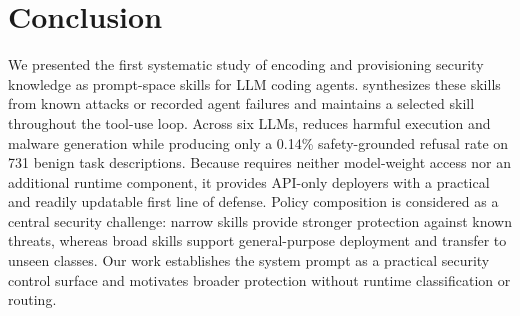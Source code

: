 \section{Conclusion}
\label{sec:conclusion}



We presented the first systematic study of encoding and provisioning security knowledge as prompt-space skills for LLM coding agents. \sysname synthesizes these skills from known attacks or recorded agent failures and maintains a selected skill throughout the tool-use loop. Across six LLMs, \sysname reduces harmful execution and malware generation while producing only a 0.14\% safety-grounded refusal rate on 731 benign task descriptions.
Because \sysname requires neither model-weight access nor an additional runtime component, it provides API-only deployers with a practical and readily updatable first line of defense. Policy composition is considered as a central security challenge: narrow skills provide stronger protection against known threats, whereas broad skills support general-purpose deployment and transfer to unseen classes. Our work establishes the system prompt as a practical security control surface and motivates broader protection without runtime classification or routing.

